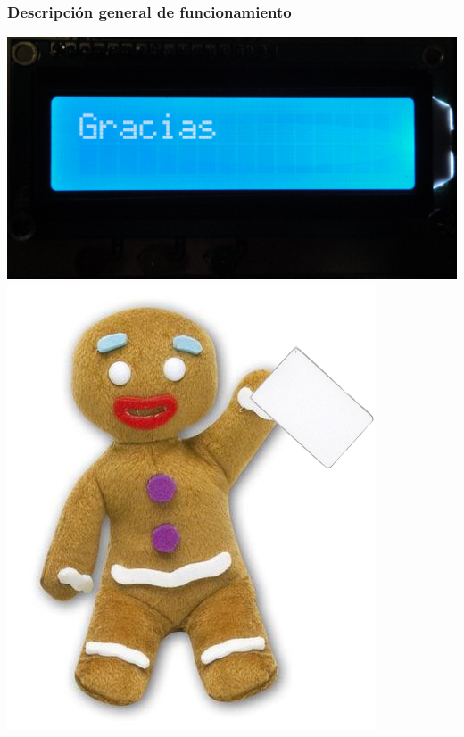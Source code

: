 \documentclass{beamer}
\begin{document}
\begin{frame}
	\frametitle{Descripción general de funcionamiento}
	\begin{center}
		\includegraphics[scale=.08]{Imagenes/grax.jpg}
		\includegraphics[scale=.35]{Imagenes/pinpon_tarj.png}
	\end{center}
\end{frame}	
\end{document}
